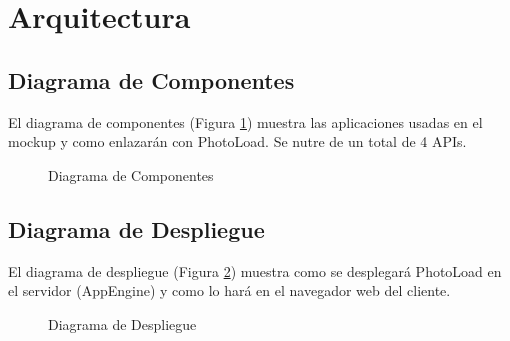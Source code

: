 \documentclass{scrartcl}
\begin{document}
\section{Arquitectura}

\subsection{Diagrama de Componentes}
El diagrama de componentes (Figura \ref{fig:DiagramaComponentes}) muestra las aplicaciones usadas en el mockup y como enlazarán con PhotoLoad. Se nutre de un total de 4 APIs.

\begin{figure}[H]
	
	\centering
	\caption{Diagrama de Componentes}
	\label{fig:DiagramaComponentes}
	
\end{figure}

\subsection{Diagrama de Despliegue}
El diagrama de despliegue (Figura \ref{fig:DiagramaDespliegue}) muestra como se desplegará PhotoLoad en el servidor (AppEngine) y como lo hará en el navegador web del cliente.

\begin{figure}[H]
	
	\centering
	\caption{Diagrama de Despliegue}
	\label{fig:DiagramaDespliegue}
	
\end{figure}
\end{document}
